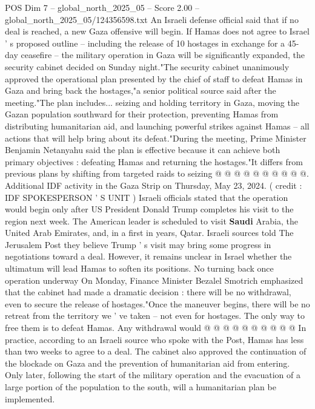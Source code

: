 \begin{textsample}{POS Dim 7 – global\_north\_2025\_05 – Score 2.00 – global\_north\_2025\_05/124356598.txt}  \label{ex:f7_pos_347}
An Israeli defense official said that if no deal is reached, a new Gaza offensive will begin.
If Hamas does not agree to Israel ' s proposed outline -- including the release of 10 hostages in exchange for a 45-day ceasefire -- the military operation in Gaza will be significantly expanded, the security cabinet decided on Sunday night."The security cabinet unanimously approved the operational plan presented by the chief of staff to defeat Hamas in Gaza and bring back the hostages,"a senior political source said after the meeting."The plan includes... seizing and holding territory in Gaza, moving the Gazan population southward for their protection, preventing Hamas from distributing humanitarian aid, and launching powerful strikes against Hamas -- all actions that will help bring about its defeat."During the meeting, Prime Minister Benjamin Netanyahu said the plan is effective because it can achieve both primary objectives : defeating Hamas and returning the hostages."It differs from previous plans by shifting from targeted raids to seizing @ @ @ @ @ @ @ @ @ @.
Additional IDF activity in the Gaza Strip on Thursday, May 23, 2024. ( credit : IDF SPOKESPERSON ' S UNIT ) Israeli officials stated that the operation would begin only after US President Donald Trump completes his visit to the region next week.
The American leader is scheduled to visit \textbf{Saudi} Arabia, the United Arab Emirates, and, in a first in years, Qatar.
Israeli sources told The Jerusalem Post they believe Trump ' s visit may bring some progress in negotiations toward a deal.
However, it remains unclear in Israel whether the ultimatum will lead Hamas to soften its positions.
No turning back once operation underway On Monday, Finance Minister Bezalel Smotrich emphasized that the cabinet had made a dramatic decision : there will be no withdrawal, even to secure the release of hostages."Once the maneuver begins, there will be no retreat from the territory we ' ve taken -- not even for hostages.
The only way to free them is to defeat Hamas.
Any withdrawal would @ @ @ @ @ @ @ @ @ @ In practice, according to an Israeli source who spoke with the Post, Hamas has less than two weeks to agree to a deal.
The cabinet also approved the continuation of the blockade on Gaza and the prevention of humanitarian aid from entering.
Only later, following the start of the military operation and the evacuation of a large portion of the population to the south, will a humanitarian plan be implemented.

\end{textsample}
